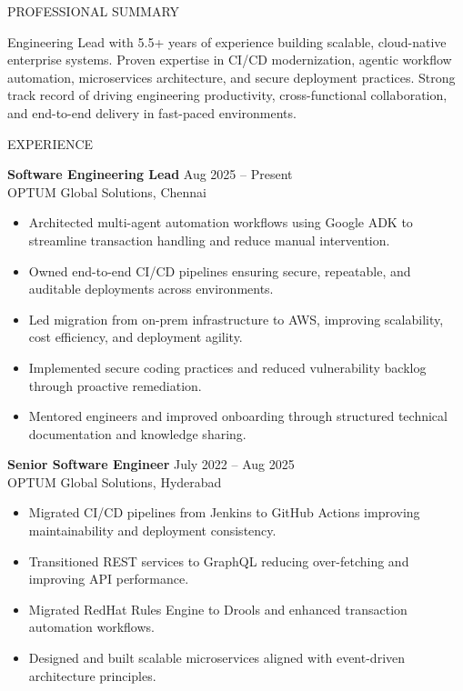 \documentclass{resume}
\begin{document}
\begin{rSection}{PROFESSIONAL SUMMARY}

Engineering Lead with 5.5+ years of experience building scalable, cloud-native enterprise systems. Proven expertise in CI/CD modernization, agentic workflow automation, microservices architecture, and secure deployment practices. Strong track record of driving engineering productivity, cross-functional collaboration, and end-to-end delivery in fast-paced environments.

\end{rSection}

\begin{rSection}{EXPERIENCE}

\textbf{Software Engineering Lead} \hfill Aug 2025 – Present \\
OPTUM Global Solutions, Chennai
\begin{itemize}
\itemsep -3pt {}
\item Architected multi-agent automation workflows using Google ADK to streamline transaction handling and reduce manual intervention.
\item Owned end-to-end CI/CD pipelines ensuring secure, repeatable, and auditable deployments across environments.
\item Led migration from on-prem infrastructure to AWS, improving scalability, cost efficiency, and deployment agility.
\item Implemented secure coding practices and reduced vulnerability backlog through proactive remediation.
\item Mentored engineers and improved onboarding through structured technical documentation and knowledge sharing.
\end{itemize}

\textbf{Senior Software Engineer} \hfill July 2022 – Aug 2025 \\
OPTUM Global Solutions, Hyderabad
\begin{itemize}
\itemsep -3pt {}
\item Migrated CI/CD pipelines from Jenkins to GitHub Actions improving maintainability and deployment consistency.
\item Transitioned REST services to GraphQL reducing over-fetching and improving API performance.
\item Migrated RedHat Rules Engine to Drools and enhanced transaction automation workflows.
\item Designed and built scalable microservices aligned with event-driven architecture principles.
\end{itemize}


\end{rSection}
\end{document}
